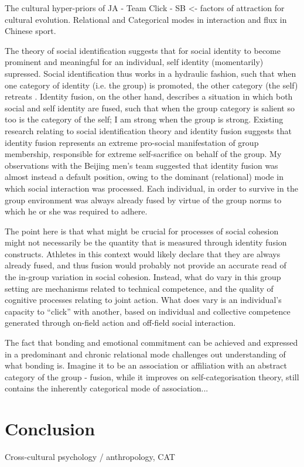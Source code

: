 \begin{CJK}{UTF8}{gbsn}
  The cultural hyper-priors of JA - Team Click - SB <- factors of attraction for cultural evolution.
  Relational and Categorical modes in interaction and flux in Chinese sport.

  The theory of social identification suggests that for social identity to become prominent and meaningful for an individual, self identity (momentarily) supressed.  Social identification thus works in a hydraulic fashion, such that when one category of identity (i.e. the group) is promoted, the other category (the self) retreats \citep{Swann2009}.  Identity fusion, on the other hand, describes a situation in which both social and self identity are fused, such that when the group category is salient so too is the category of the self; I am strong when the group is strong.  Existing research relating to social identification theory and identity fusion suggests that identity fusion represents an extreme pro-social manifestation of group membership, responsible for extreme self-sacrifice on behalf of the group.  My observations with the Beijing men's team suggested that identity fusion was almost instead a default position, owing to the dominant (relational) mode in which social interaction was processed.  Each individual, in order to survive in the group environment was always already fused by virtue of the group norms to which he or she was required to adhere.

  The point here is that what might be crucial for processes of social cohesion might not necessarily be the quantity that is measured through identity fusion constructs. Athletes in this context would likely declare that they are always already fused, and thus fusion would probably not provide an accurate read of the in-group variation in social cohesion. Instead, what do vary in this group setting are mechanisms related to technical competence, and the quality of cognitive processes relating to joint action.  What does vary is an individual's capacity to ``click'' with another, based on individual and collective competence generated through on-field action and off-field social interaction.

  The fact that bonding and emotional commitment can be achieved and expressed in a predominant and chronic relational mode challenges out understanding of what bonding is.  Imagine it to be an association or affiliation with an abstract category of the group - fusion, while it improves on self-categorisation theory, still contains the inherently categorical mode of association...




  \section{Conclusion}
  Cross-cultural psychology / anthropology, CAT


                                                          \end{CJK}
